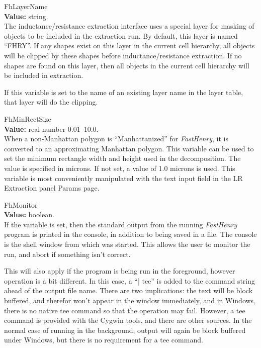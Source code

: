 \begin{description}
\item{\et FhLayerName}\\
{\bf Value:} string.\\
The inductance/resistance extraction interface uses a special layer
for masking of objects to be included in the extraction run.  By
default, this layer is named ``{\vt FHRY}''.  If any shapes exist on
this layer in the current cell hierarchy, all objects will be clipped
by these shapes before inductance/resistance extraction.  If no shapes
are found on this layer, then all objects in the current cell
hierarchy will be included in extraction.

If this variable is set to the name of an existing layer name in the
layer table, that layer will do the clipping.

\item{\et FhMinRectSize}\\
{\bf Value:} real number 0.01--10.0.\\
When a non-Manhattan polygon is ``Manhattanized'' for {\it FastHenry},
it is converted to an approximating Manhattan polygon.  This variable
can be used to set the minimum rectangle width and height used in the
decomposition.  The value is specified in microns.  If not set, a
value of 1.0 microns is used.  This variable is most conveniently
manipulated with the text input field in the {\cb LR Extraction} panel
{\cb Params} page.

\item{\et FhMonitor}\\
{\bf Value:} boolean.\\
If the variable is set, then the standard output from the running {\it
FastHenry} program is printed in the console, in addition to being
saved in a file.  The console is the shell window from which {\Xic}
was started.  This allows the user to monitor the run, and abort if
something isn't correct.

This will also apply if the program is being run in the foreground,
however operation is a bit different.  In this case, a ``{\vt | tee}''
is added to the command string ahead of the output file name.  There
are two implications:  the text will be block buffered, and therefor
won't appear in the window immediately, and in Windows, there is no
native {\vt tee} command so that the operation may fail.  However, a
{\vt tee} command is provided with the Cygwin tools, and there are
other sources.  In the normal case of running in the background,
output will again be block buffered under Windows, but there is no
requirement for a {\vt tee} command.


\end{description}
